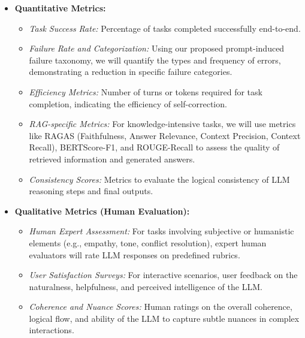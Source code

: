 \documentclass{article}
\begin{document}
\begin{itemize}
    \item \textbf{Quantitative Metrics:}
    \begin{itemize}
        \item \textit{Task Success Rate:} Percentage of tasks completed successfully end-to-end.
        \item \textit{Failure Rate and Categorization:} Using our proposed prompt-induced failure taxonomy, we will quantify the types and frequency of errors, demonstrating a reduction in specific failure categories.
        \item \textit{Efficiency Metrics:} Number of turns or tokens required for task completion, indicating the efficiency of self-correction.
        \item \textit{RAG-specific Metrics:} For knowledge-intensive tasks, we will use metrics like RAGAS \cite{ragas_paper} (Faithfulness, Answer Relevance, Context Precision, Context Recall), BERTScore-F1, and ROUGE-Recall \cite{paper5_legalrag} to assess the quality of retrieved information and generated answers.
        \item \textit{Consistency Scores:} Metrics to evaluate the logical consistency of LLM reasoning steps and final outputs.
    \end{itemize}
    \item \textbf{Qualitative Metrics (Human Evaluation):}
    \begin{itemize}
        \item \textit{Human Expert Assessment:} For tasks involving subjective or humanistic elements (e.g., empathy, tone, conflict resolution), expert human evaluators will rate LLM responses on predefined rubrics.
        \item \textit{User Satisfaction Surveys:} For interactive scenarios, user feedback on the naturalness, helpfulness, and perceived intelligence of the LLM.
        \item \textit{Coherence and Nuance Scores:} Human ratings on the overall coherence, logical flow, and ability of the LLM to capture subtle nuances in complex interactions.
    \end{itemize}
\end{itemize}
\end{document}
